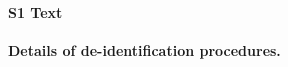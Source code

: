 \documentclass[10pt,letterpaper]{article}\usepackage[]{graphicx}\usepackage[]{color}
\begin{document}
\paragraph*{S1 Text}
\label{S1_Text}
{\bf Details of de-identification procedures.}





\end{document}
